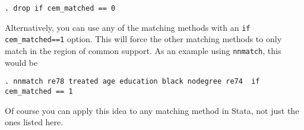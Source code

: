 \documentclass[11pt]{article}
\begin{document}
\begin{verbatim}
. drop if cem_matched == 0
\end{verbatim}

Alternatively, you can use any of the matching methods with an 
\texttt{if cem\_matched==1} option. This will force the other matching 
methods to only match in the region of common support. As an example using
\texttt{nnmatch}, this would be

\begin{verbatim}
. nnmatch re78 treated age education black nodegree re74  if cem_matched == 1
\end{verbatim}
Of course  you can apply this idea to any matching method in Stata, not
just the ones listed here. 


 

\end{document}
